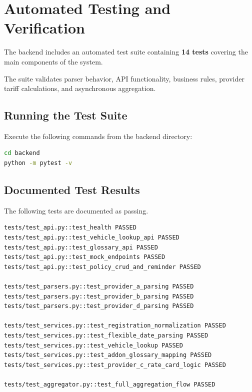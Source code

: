 \documentclass[11pt,a4paper]{article}
\begin{document}

\section{Automated Testing and Verification}

The backend includes an automated test suite containing
\textbf{14 tests} covering the main components of the system.

The suite validates parser behavior, API functionality,
business rules, provider tariff calculations, and asynchronous
aggregation.

\subsection{Running the Test Suite}

Execute the following commands from the backend directory:

\begin{lstlisting}[language=bash,caption={Automated Test Execution}]
cd backend
python -m pytest -v
\end{lstlisting}

\subsection{Documented Test Results}

The following tests are documented as passing.

\begin{lstlisting}[caption={pytest Test Suite Results}]
tests/test_api.py::test_health PASSED
tests/test_api.py::test_vehicle_lookup_api PASSED
tests/test_api.py::test_glossary_api PASSED
tests/test_api.py::test_mock_endpoints PASSED
tests/test_api.py::test_policy_crud_and_reminder PASSED

tests/test_parsers.py::test_provider_a_parsing PASSED
tests/test_parsers.py::test_provider_b_parsing PASSED
tests/test_parsers.py::test_provider_d_parsing PASSED

tests/test_services.py::test_registration_normalization PASSED
tests/test_services.py::test_flexible_date_parsing PASSED
tests/test_services.py::test_vehicle_lookup PASSED
tests/test_services.py::test_addon_glossary_mapping PASSED
tests/test_services.py::test_provider_c_rate_card_logic PASSED

tests/test_aggregator.py::test_full_aggregation_flow PASSED
\end{lstlisting}
\end{document}
